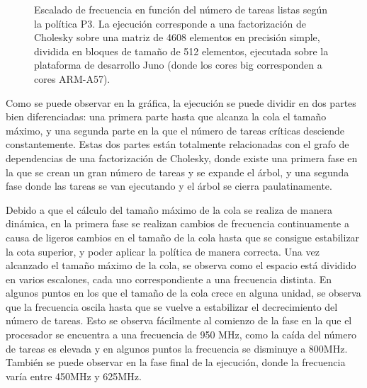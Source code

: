 \begin{figure}
  \centering
  {
    \setlength{\fboxsep}{-10pt}
  }
  \caption[Escalado de frecuencia en función del número de tareas listas
  según la política P3]{Escalado de frecuencia en función del número de
    tareas listas según la política P3. La ejecución corresponde a una
    factorización de Cholesky sobre una matriz de 4608 elementos en
    precisión simple, dividida en bloques de tamaño de 512 elementos,
    ejecutada sobre la plataforma de desarrollo Juno (donde los cores big
    corresponden a cores ARM-A57).}
  \label{s5:fig:P3-evo}
\end{figure}


Como se puede observar en la gráfica, la ejecución se puede dividir en dos
partes bien diferenciadas: una primera parte hasta que alcanza la cola el tamaño
máximo, y una segunda parte en la que el número de tareas críticas
desciende constantemente. Estas dos partes están totalmente relacionadas
con el grafo de dependencias de una factorización de Cholesky, donde existe
una primera fase en la que se crean un gran número de tareas y se expande
el árbol, y una segunda fase donde las tareas se van ejecutando y el árbol
se cierra paulatinamente.

Debido a que el cálculo del tamaño máximo de la cola se realiza de manera dinámica,
en la primera fase se realizan cambios de frecuencia continuamente a causa
de ligeros cambios en el tamaño de la cola hasta que se consigue
estabilizar la cota superior, y poder aplicar la política de manera
correcta. Una vez alcanzado el tamaño máximo de la cola, se observa
como el espacio está dividido en varios escalones, cada uno correspondiente
a una frecuencia distinta. En algunos puntos en los que el tamaño de la
cola crece en alguna unidad, se observa que la frecuencia oscila hasta que
se vuelve a estabilizar el decrecimiento del número de tareas.  Esto se
observa fácilmente al comienzo de la fase en la que el procesador se
encuentra a una frecuencia de 950 MHz, como la caída del número de tareas
es elevada y en algunos puntos la frecuencia se disminuye a 800MHz. También
se puede observar en la fase final de la ejecución, donde la frecuencia
varía entre 450MHz y 625MHz.

